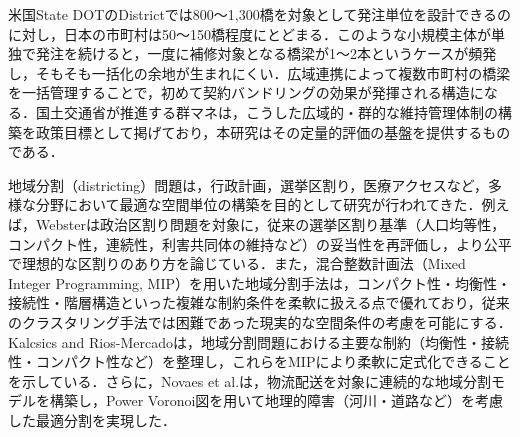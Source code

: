 \documentclass[Journal,letterpaper,InsideFigs,NoLineNumbers]{ascelike-new}
\begin{document}
米国State DOTのDistrictでは800〜1,300橋を対象として発注単位を設計できるのに対し，日本の市町村は50〜150橋程度にとどまる．このような小規模主体が単独で発注を続けると，一度に補修対象となる橋梁が1〜2本というケースが頻発し，そもそも一括化の余地が生まれにくい\cite{shikoku2019}．広域連携によって複数市町村の橋梁を一括管理することで，初めて契約バンドリングの効果が発揮される構造になる\cite{nara2023,mlit2024senkojirei}．国土交通省が推進する群マネ\cite{mlit2025gunmane}は，こうした広域的・群的な維持管理体制の構築を政策目標として掲げており，本研究はその定量的評価の基盤を提供するものである．

地域分割（districting）問題は，行政計画，選挙区割り，医療アクセスなど，多様な分野において最適な空間単位の構築を目的として研究が行われてきた．例えば，Webster\cite{webster2013}は政治区割り問題を対象に，従来の選挙区割り基準（人口均等性，コンパクト性，連続性，利害共同体の維持など）の妥当性を再評価し，より公平で理想的な区割りのあり方を論じている．また，混合整数計画法（Mixed Integer Programming, MIP）を用いた地域分割手法は，コンパクト性・均衡性・接続性・階層構造といった複雑な制約条件を柔軟に扱える点で優れており，従来のクラスタリング手法では困難であった現実的な空間条件の考慮を可能にする．Kalcsics and Rios-Mercado\cite{kalcsics2019}は，地域分割問題における主要な制約（均衡性・接続性・コンパクト性など）を整理し，これらをMIPにより柔軟に定式化できることを示している．さらに，Novaes et al.\cite{novaes2010}は，物流配送を対象に連続的な地域分割モデルを構築し，Power Voronoi図を用いて地理的障害（河川・道路など）を考慮した最適分割を実現した．
\end{document}
